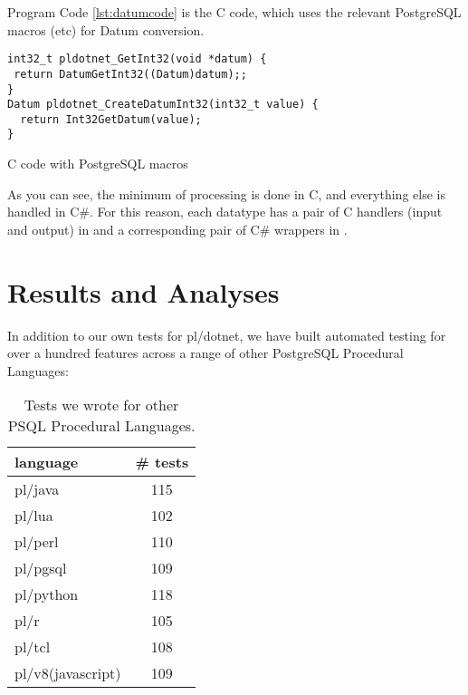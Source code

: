 \documentclass[sigconf,techreport,authorversion,nonacm]{acmart}
\begin{document}
Program Code \ref{lst:datumcode} is the C code, which uses the
relevant PostgreSQL macros (etc) for Datum conversion.

\begin{listing}[H]
\begin{verbatim}
int32_t pldotnet_GetInt32(void *datum) {
 return DatumGetInt32((Datum)datum);;
}
Datum pldotnet_CreateDatumInt32(int32_t value) {
  return Int32GetDatum(value);
}
\end{verbatim}
\caption{C code with PostgreSQL macros}
\label{lst:datumcode}
\end{listing}

As you can see, the minimum of processing is done in C, and everything
else is handled in C\#.  For this reason, each datatype has a pair
of C handlers (input and output) in
 and a corresponding
pair of C\# wrappers in .

\section{Results and Analyses}

In addition to our own tests for pl/dotnet, we have built automated
testing for over a hundred features across a range of other PostgreSQL
Procedural Languages:

\begin{table}[!htbp]
       \caption{Tests we wrote for other PSQL Procedural Languages.}
       \begin{tabular}{l | c }
               \toprule
               \rowcolor{gray!25} \textbf{language} & \textbf{\# tests} \\ \midrule
               pl/java                                 & 115               \\
               pl/lua                                  & 102               \\
               pl/perl                                 & 110               \\
               pl/pgsql                                & 109               \\
               pl/python                               & 118               \\
               pl/r                                    & 105               \\
               pl/tcl                                  & 108               \\
               pl/v8(javascript)                       & 109               \\ \bottomrule
       \end{tabular}
\end{table}
\end{document}
